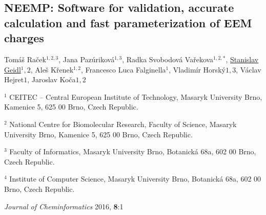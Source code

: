 \begin{center}

\section{NEEMP: Software
for validation, accurate calculation and fast parameterization of EEM charges}

Tomáš Raček$^{1,2,3}$, Jana Pazúriková$^{1,3}$, Radka Svobodová Vařekova$^{1,2,*}$,
\underline{Stanislav Geidl$^1,2$}, Aleš Křenek$^{1,2}$, Francesco Luca
Falginella$^1$, Vladimír Horský$1,3$, Václav Hejret$1$, Jaroslav Koča${1,2}$


\vspace{1cm}


$^1$ CEITEC -- Central European Institute of Technology,
Masaryk University Brno, Kamenice 5, 625 00 Brno, Czech Republic.

$^2$ National Centre for Biomolecular Research, Faculty of Science,
Masaryk University Brno, Kamenice 5, 625 00 Brno, Czech Republic.

$^3$ Faculty of Informatics, Masaryk University Brno, Botanická 68a, 602 00 Brno,
Czech Republic.

$^4$ Institute of Computer Science, Masaryk University Brno, Botanická 68a,
602 00 Brno, Czech Republic.

\vspace{1cm}

\textit{Journal of Cheminformatics} 2016, \textbf{8}:1
\end{center}


